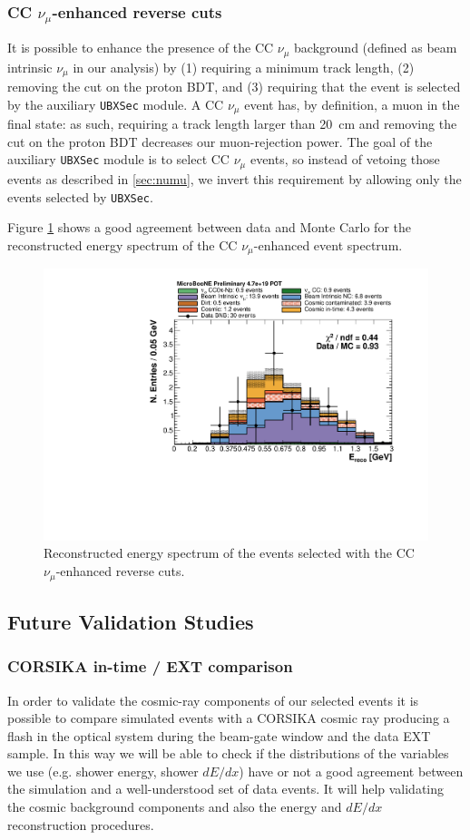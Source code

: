 \subsubsection{CC \texorpdfstring{$\nu_{\mu}$}{numu}-enhanced reverse cuts}
It is possible to enhance the presence of the CC $\nu_{\mu}$ background (defined as beam intrinsic $\nu_{\mu}$ in our analysis) by (1) requiring a minimum track length, (2) removing the cut on the proton BDT, and (3) requiring that the event is selected by the auxiliary \texttt{UBXSec} module. 
A CC $\nu_{\mu}$ event has, by definition, a muon in the final state: as such, requiring a track length larger than 20~cm and removing the cut on the proton BDT decreases our muon-rejection power. The goal of the auxiliary \texttt{UBXSec} module is to select CC $\nu_{\mu}$ events, so instead of vetoing those events as described in \ref{sec:numu}, we invert this requirement by allowing only the events selected by \texttt{UBXSec}.

Figure \ref{fig:numu_inverted} shows a good agreement between data and Monte Carlo for the reconstructed energy spectrum of the CC $\nu_{\mu}$-enhanced event spectrum.

\begin{figure}[htbp]
\centering
  \includegraphics[width=0.65\linewidth]{figures/numu_reco.pdf}
  \caption{Reconstructed energy spectrum of the events selected with the CC $\nu_{\mu}$-enhanced reverse cuts.}\label{fig:numu_inverted}
\end{figure}

\subsection{Future Validation Studies}

\subsubsection{CORSIKA in-time / EXT comparison}
In order to validate the cosmic-ray components of our selected events it is possible to compare simulated events with a CORSIKA cosmic ray producing a flash in the optical system during the beam-gate window and the data EXT sample. 
In this way we will be able to check if the distributions of the variables we use (e.g. shower energy, shower $dE/dx$) have or not a good agreement between the simulation and a well-understood set of data events. 
It will help validating the cosmic background components and also the energy and $dE/dx$ reconstruction procedures.


